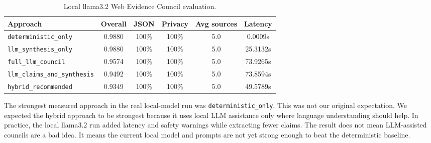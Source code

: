 \begin{table}[htbp]
\centering
\caption{Local llama3.2 Web Evidence Council evaluation.}
\label{tab:web_evidence_eval_llama}
\begin{tabular}{p{} c c c c c}
\toprule
\textbf{Approach} & \textbf{Overall} & \textbf{JSON} & \textbf{Privacy} & \textbf{Avg sources} & \textbf{Latency}\\
\midrule
\texttt{deterministic\_only} & 0.9880 & 100\% & 100\% & 5.0 & 0.0009s\\
\texttt{llm\_synthesis\_only} & 0.9880 & 100\% & 100\% & 5.0 & 25.3132s\\
\texttt{full\_llm\_council} & 0.9574 & 100\% & 100\% & 5.0 & 73.9265s\\
\texttt{llm\_claims\_and\_synthesis} & 0.9492 & 100\% & 100\% & 5.0 & 73.8594s\\
\texttt{hybrid\_recommended} & 0.9349 & 100\% & 100\% & 5.0 & 49.5789s\\
\bottomrule
\end{tabular}
\end{table}

The strongest measured approach in the real local-model run was \texttt{deterministic\_only}. This was not our original expectation. We expected the hybrid approach to be strongest because it uses local LLM assistance only where language understanding should help. In practice, the local llama3.2 run added latency and safety warnings while extracting fewer claims. The result does not mean LLM-assisted councils are a bad idea. It means the current local model and prompts are not yet strong enough to beat the deterministic baseline.

